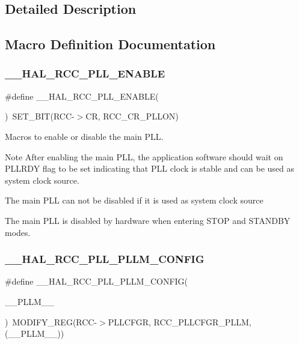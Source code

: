\subsection{Detailed Description}


\subsection{Macro Definition Documentation}
\mbox{\label{group___r_c_c___p_l_l___configuration_gaaf196a2df41b0bcbc32745c2b218e696}} 
\subsubsection{\texorpdfstring{\_\_HAL\_RCC\_PLL\_ENABLE}{\_\_HAL\_RCC\_PLL\_ENABLE}}
{\footnotesize\ttfamily \#define \+\_\+\+\_\+\+H\+A\+L\+\_\+\+R\+C\+C\+\_\+\+P\+L\+L\+\_\+\+E\+N\+A\+B\+LE(\begin{DoxyParamCaption}{ }\end{DoxyParamCaption})~S\+E\+T\+\_\+\+B\+IT(R\+CC-\/$>$CR, R\+C\+C\+\_\+\+C\+R\+\_\+\+P\+L\+L\+ON)}



Macros to enable or disable the main P\+LL. 

\begin{DoxyNote}{Note}
After enabling the main P\+LL, the application software should wait on P\+L\+L\+R\+DY flag to be set indicating that P\+LL clock is stable and can be used as system clock source. 

The main P\+LL can not be disabled if it is used as system clock source 

The main P\+LL is disabled by hardware when entering S\+T\+OP and S\+T\+A\+N\+D\+BY modes. 
\end{DoxyNote}
\mbox{\label{group___r_c_c___p_l_l___configuration_gabca62f581e6c2553cca7ef0d7a2a4b7f}} 
\subsubsection{\texorpdfstring{\_\_HAL\_RCC\_PLL\_PLLM\_CONFIG}{\_\_HAL\_RCC\_PLL\_PLLM\_CONFIG}}
{\footnotesize\ttfamily \#define \+\_\+\+\_\+\+H\+A\+L\+\_\+\+R\+C\+C\+\_\+\+P\+L\+L\+\_\+\+P\+L\+L\+M\+\_\+\+C\+O\+N\+F\+IG(\begin{DoxyParamCaption}\item[{}]{\+\_\+\+\_\+\+P\+L\+L\+M\+\_\+\+\_\+ }\end{DoxyParamCaption})~M\+O\+D\+I\+F\+Y\+\_\+\+R\+EG(R\+CC-\/$>$P\+L\+L\+C\+F\+GR, R\+C\+C\+\_\+\+P\+L\+L\+C\+F\+G\+R\+\_\+\+P\+L\+LM, (\+\_\+\+\_\+\+P\+L\+L\+M\+\_\+\+\_\+))}




